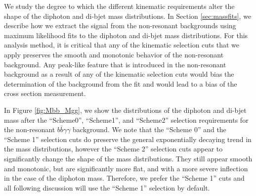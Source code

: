 \documentclass{cmspaper}
\begin{document}
We study the degree to which the different kinematic requirements alter the shape
of the diphoton and di-bjet mass distributions. In Section \ref{sec:massfits}, we describe how we 
extract the signal from the non-resonant backgrounds using maximum likelihood fits to the
diphoton and di-bjet mass distributions. For this analysis method, it is critical that any of the kinematic selection cuts
that we apply preserves the smooth and monotonic behavior of the non-resonant background. Any
peak-like feature that is introduced in the non-resonant background as a result of any of the
kinematic selection cuts would bias the determination of the background from the fit and would lead
to a bias of the cross section measurement. 

In Figure \ref{fig:Mbb_Mgg}, we show the distributions of the diphoton and di-bjet mass after the 
``Scheme0'', ``Scheme1'', and ``Scheme2'' selection requirements for the non-resonant 
$b\bar{b}\gamma\gamma$ background. We note that the ``Scheme 0'' and the ``Scheme 1'' selection 
cuts do preserve the general exponentially decaying trend in the mass distributions, 
however the ``Scheme 2''  selection cuts appear to significantly change the shape of the 
mass distributions. They still appear smooth and monotonic, but are significantly more flat,
and with a more severe inflection in the case of the diphoton mass. Therefore, we prefer
the ``Scheme 1'' cuts and all following discussion will use the ``Scheme 1'' selection
by default. 
\end{document}
